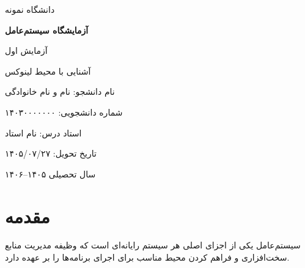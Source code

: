 \documentclass[12pt,a4paper]{article}
\newcommand{\universityname}{دانشگاه نمونه}
\newcommand{\coursename}{آزمایشگاه سیستم‌عامل}
\newcommand{\reporttitle}{آشنایی با محیط لینوکس}
\newcommand{\experimentnumber}{آزمایش اول}
\newcommand{\studentname}{نام و نام خانوادگی}
\newcommand{\studentid}{۱۴۰۳۰۰۰۰۰۰۰}
\newcommand{\professorname}{نام استاد}
\newcommand{\submissiondate}{۱۴۰۵/۰۷/۲۷}
\newcommand{\academicyear}{۱۴۰۵--۱۴۰۶}
\begin{document}
\begin{titlepage}
\begin{center}

\vspace*{1cm}

{\Large \universityname}

\vspace{1.2cm}

{\Huge\bfseries \coursename}

\vspace{0.8cm}

{\LARGE \experimentnumber}

\vspace{0.4cm}

{\Large \reporttitle}

\vspace{2cm}

{\large نام دانشجو: \studentname}

\vspace{0.5cm}

{\large شماره دانشجویی: \studentid}

\vspace{0.5cm}

{\large استاد درس: \professorname}

\vspace{0.5cm}

{\large تاریخ تحویل: \submissiondate}

\vfill

{\large سال تحصیلی \academicyear}

\end{center}
\end{titlepage}

\tableofcontents
\clearpage

\section{مقدمه}

سیستم‌عامل یکی از اجزای اصلی هر سیستم رایانه‌ای است
که وظیفه مدیریت منابع سخت‌افزاری و فراهم کردن
محیط مناسب برای اجرای برنامه‌ها را بر عهده دارد.
\end{document}
